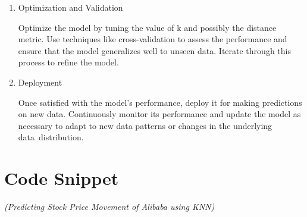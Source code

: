 \documentclass[12pt,a4paper]{report}
\newenvironment{codedstep}[1][]
  {\begin{enumerate}[label=Step \arabic*:]}
  {\end{enumerate}}
\begin{document}
\begin{codedstep}
\item Optimization and Validation

Optimize the model by tuning the value of k and possibly the distance metric. Use techniques like cross-validation to assess the performance and ensure that the model generalizes well to unseen data. Iterate through this process to refine the model.

\item Deployment

Once satisfied with the model’s performance, deploy it for making predictions on new data. Continuously monitor its performance and update the model as necessary to adapt to new data patterns or changes in the underlying data distribution.
\end{codedstep}

\section{Code Snippet} \textit{(Predicting Stock Price Movement of Alibaba using KNN)}
\end{document}
